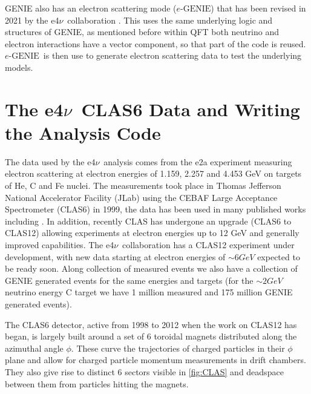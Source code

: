 \documentclass[a4paper,12pt]{article}
\newcommand{\efn}{e4$\nu$}
\newcommand{\eGEN}{$e\text{-GENIE}$}
\begin{document}
GENIE also has an electron scattering mode (\eGEN) that has been revised in 2021 by the \efn\ collaboration \cite{e4ncollaborationInclusiveElectronScattering2021}.
This uses the same underlying logic and structures of GENIE, as mentioned before within QFT both neutrino and electron interactions have a vector component, so that part of the code is reused.
\eGEN\ is then use to generate electron scattering data to test the underlying models.

\section{The \efn\ CLAS6 Data and Writing the Analysis Code}
The data used by the \efn\ analysis comes from the e2a experiment measuring electron scattering at electron energies of 1.159, 2.257 and 4.453 \si{GeV} on targets of He, C and Fe nuclei.
The measurements took place in Thomas Jefferson National Accelerator Facility (JLab) using the CEBAF Large Acceptance Spectrometer (CLAS6) \cite{meckingCEBAFLargeAcceptance2003} in 1999, the data has been used in many published works including \cite{khachatryanElectronbeamEnergyReconstruction2021}.
In addition, recently CLAS has undergone an upgrade (CLAS6 to CLAS12) \cite{burkertCLAS12SpectrometerJefferson2020} allowing experiments at electron energies up to 12 \si{GeV} and generally improved capabilities.
The \efn\ collaboration has a CLAS12 experiment under development, with new data starting at electron energies of $\sim6 \si{GeV}$ expected to be ready soon.
Along collection of measured events we also have a collection of GENIE generated events for the same energies and targets (for the $\sim 2\si{GeV}$ neutrino energy C target we have 1 million measured and 175 million GENIE generated events).

The CLAS6 detector, active from 1998 to 2012 when the work on CLAS12 has began, is largely built around a set of 6 toroidal magnets distributed along the azimuthal angle $\phi$.
These curve the trajectories of charged particles in their $\phi$ plane and allow for charged particle momentum measurements in drift chambers.
They also give rise to distinct 6 sectors visible in \cref{fig:CLAS} and deadspace between them from particles hitting the magnets.
\end{document}
